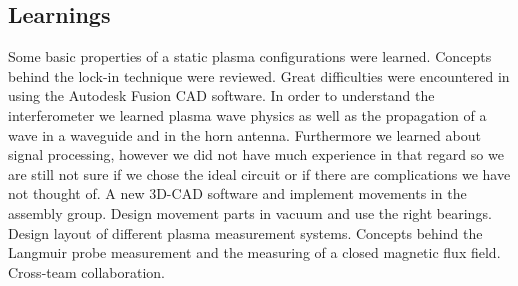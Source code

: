 \subsection{Learnings}


Some basic properties of a static plasma configurations were learned.
Concepts behind the lock-in technique were reviewed.
Great difficulties were encountered in using the Autodesk Fusion CAD software.
In order to understand the interferometer we learned plasma wave physics as well as the propagation of a wave in a waveguide and in the horn antenna. Furthermore we learned about signal processing, however we did not have much experience in that regard so we are still not sure if we chose the ideal circuit or if there are complications we have not thought of. A new 3D-CAD software and implement movements in the assembly group. Design movement parts in vacuum and use the right bearings. Design layout of different plasma measurement systems. Concepts behind the Langmuir probe measurement and the measuring of a closed magnetic flux field. Cross-team collaboration.
